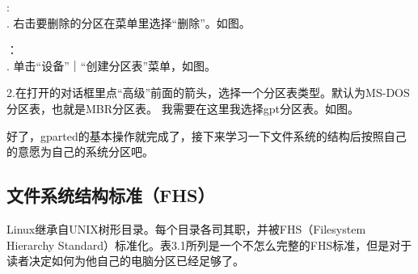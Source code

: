 \documentclass[amstex,twoside]{ctexbook}
\begin{document}
:\\. 右击要删除的分区在菜单里选择“删除”。如图。 %


：\\. 单击“设备”｜“创建分区表”菜单，如图。


\indent2.在打开的对话框里点“高级”前面的箭头，选择一个分区表类型。默认为MS-DOS分区表，也就是MBR分区表。
我需要在这里我选择gpt分区表。如图。

\FloatBarrier

好了，gparted的基本操作就完成了，接下来学习一下文件系统的结构后按照自己的意愿为自己的系统分区吧。

\subsection{文件系统结构标准（FHS）}

Linux继承自UNIX树形目录。每个目录各司其职，并被FHS（Filesystem Hierarchy Standard）标准化。表3.1所列是一个不怎么完整的FHS标准，但是对于读者决定如何为他自己的电脑分区已经足够了。
\end{document}
